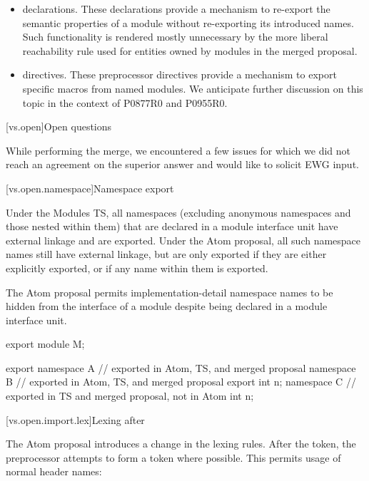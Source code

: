 \begin{itemize}
\item
{} declarations.
These declarations provide a mechanism to re-export
the semantic properties of a module
without re-exporting its introduced names.
Such functionality is rendered mostly unnecessary
by the more liberal reachability rule
used for entities owned by modules
in the merged proposal.

\item
{} directives.
These preprocessor directives provide a mechanism
to export specific macros from named modules.
We anticipate further discussion on this topic
in the context of P0877R0 and P0955R0.
\end{itemize}

[vs.open]{Open questions}

\pnum
While performing the merge, we encountered a few issues
for which we did not reach an agreement on the superior answer
and would like to solicit EWG input.

[vs.open.namespace]{Namespace export}

\pnum
Under the Modules TS,
all namespaces
(excluding anonymous namespaces and those nested within them)
that are declared in a module interface unit
have external linkage and
are exported.
Under the Atom proposal,
all such namespace names
still have external linkage,
but are only exported if they are either
explicitly exported, or
if any name within them is exported.
\begin{note}
The Atom proposal permits implementation-detail namespace names
to be hidden from the interface of a module
despite being declared in a module interface unit.
\end{note}

\pnum
\begin{example}
\begin{codeblock}
export module M;

export namespace A {} // exported in Atom, TS, and merged proposal
namespace B {         // exported in Atom, TS, and merged proposal
  export int n;
}
namespace C {         // exported in TS and merged proposal, not in Atom
  int n;
}
\end{codeblock}
\end{example}

[vs.open.import.lex]{Lexing after }

\pnum
The Atom proposal introduces a change in the \Cpp{} lexing rules.
After the  token,
the preprocessor attempts to form a 
token where possible.
This permits usage of normal header names:

